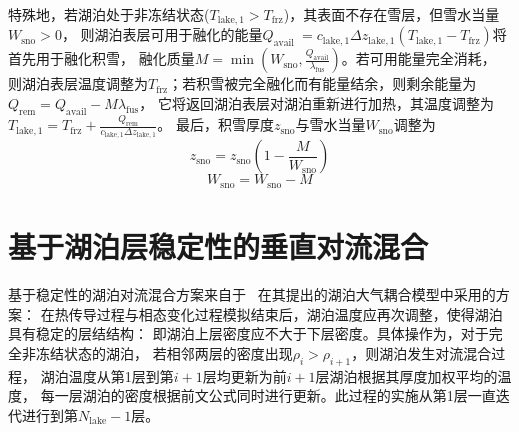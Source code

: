特殊地，若湖泊处于非冻结状态($T_{\mathrm{lake,1}}>T_{\mathrm {frz}} $)，其表面不存在雪层，但雪水当量$W_{\mathrm{sno}}>0$，
则湖泊表层可用于融化的能量$Q_{\text {avail }}=c_{\mathrm{lake, 1}} \Delta z_{\mathrm{lake, 1}}\left(T_{\mathrm{lake, 1}}-T_{\mathrm {frz}}\right)$将首先用于融化积雪，
融化质量$M=\min{\left(W_{\mathrm{sno}},\frac{Q_{\mathrm{avail}}}{\lambda_{\mathrm {fus}} }\right)}$。若可用能量完全消耗，
则湖泊表层温度调整为$T_{\mathrm {frz}} $；若积雪被完全融化而有能量结余，则剩余能量为$Q_{\mathrm{rem}}=Q_{\mathrm{avail}}-M\lambda_{\mathrm {fus}} $，
它将返回湖泊表层对湖泊重新进行加热，其温度调整为$T_{\mathrm{lake, 1}}=T_{\mathrm {frz}}+\frac{Q_{\mathrm{rem}}}{c_{\mathrm{lake, 1}} \Delta z_{\mathrm{lake, 1}}}$。
最后，积雪厚度$z_{\mathrm{sno}}$与雪水当量$W_{\mathrm{sno}}$调整为
\begin{equation}
  z_{\mathrm{sno}}=z_{\mathrm{sno}}\left(1-\frac{M}{W_{\mathrm{sno}}}\right)
\end{equation}
\begin{equation}
  W_{\mathrm{sno}}=W_{\mathrm{sno}}-M
\end{equation}

\section{基于湖泊层稳定性的垂直对流混合}
基于稳定性的湖泊对流混合方案来自于~\citet{hostetler1993interactive,hostetler1994lake} 在其提出的湖泊大气耦合模型中采用的方案：
在热传导过程与相态变化过程模拟结束后，湖泊温度应再次调整，使得湖泊具有稳定的层结结构：
即湖泊上层密度应不大于下层密度。具体操作为，对于完全非冻结状态的湖泊，
若相邻两层的密度出现$\rho_i>\rho_{i+1}$，则湖泊发生对流混合过程，
湖泊温度从第1层到第$i+1$层均更新为前$i+1$层湖泊根据其厚度加权平均的温度，
每一层湖泊的密度根据前文公式同时进行更新。此过程的实施从第1层一直迭代进行到第$N_{\mathrm{lake}}-1$层。


